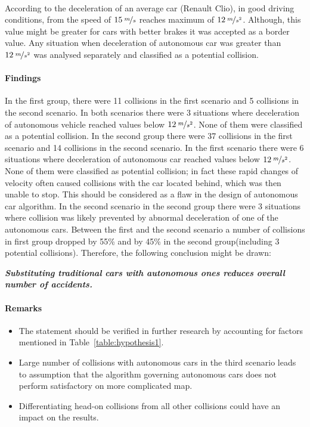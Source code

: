 \documentclass[11pt,english]{article}
\begin{document}
According to \citet{vangi2007evaluation} the deceleration of an average car (Renault Clio\textsuperscript{\textregistered}), in good driving conditions, from the speed of $15\:\nicefrac{m}{s}$ reaches maximum of $12\:\nicefrac{m}{s^2}$. Although, this value might be greater for cars with better brakes it was accepted as a border value. Any situation when deceleration of autonomous car was greater than $12\:\nicefrac{m}{s^2}$ was analysed separately and classified as a potential collision. 



\paragraph{Findings}

In the first group, there were 11 collisions in the first scenario and 5 collisions in the second scenario. In both scenarios there were 3 situations where deceleration of autonomous vehicle reached values below $12\:\nicefrac{m}{s^2}$. None of them were classified as a potential collision. 
In the second group there were 37 collisions in the first scenario and 14 collisions in the second scenario. In the first scenario there were 6 situations where deceleration of autonomous car reached values below $12\:\nicefrac{m}{s^2}$. None of them were classified as potential collision; in fact these rapid changes of velocity often caused collisions with the car located behind, which was then unable to stop. This should be considered as a flaw in the design of autonomous car algorithm. In the second scenario in the second group there were 3 situations where collision was likely prevented by abnormal deceleration of one of the autonomous cars. Between the first and the second scenario a number of collisions in first group dropped by 55\% and by 45\% in the second group(including 3 potential collisions). Therefore, the following conclusion might be drawn:

\textbf{\textit{Substituting traditional cars with autonomous ones reduces overall number of accidents.}}



\paragraph{Remarks}

\begin{itemize}
  \item The statement should be verified in further research by accounting for factors mentioned in Table~\ref{table:hypothesis1}.
  \item Large number of collisions with autonomous cars in the third scenario leads to assumption that the algorithm governing autonomous cars does not perform satisfactory on more complicated map. 
  \item Differentiating head-on collisions from all other collisions could have an impact on the results.
\end{itemize}
\end{document}

